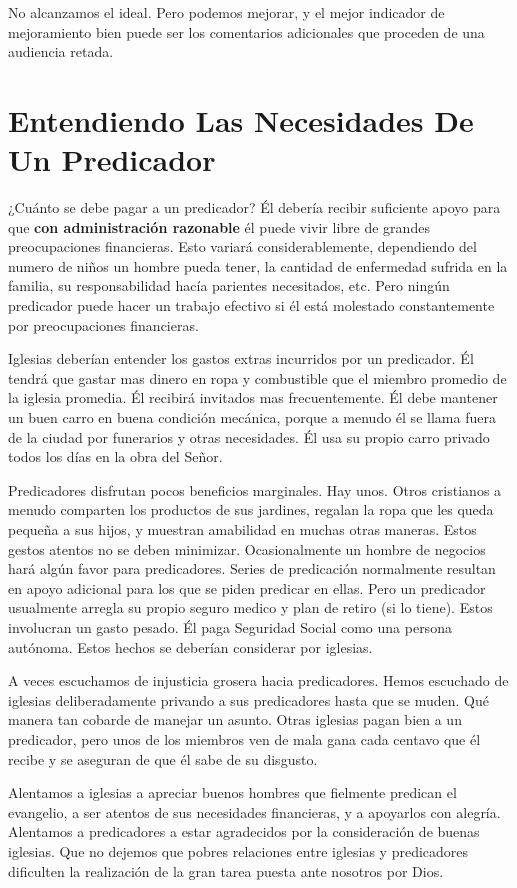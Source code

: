 \documentclass[12pt, twoside, openright]{book}
\begin{document}
No alcanzamos el ideal. Pero podemos mejorar, y el mejor indicador de mejoramiento bien puede ser los comentarios adicionales que proceden de una audiencia retada.

\section{Entendiendo Las Necesidades De Un Predicador}
¿Cuánto se debe pagar a un predicador? Él debería recibir suficiente apoyo para que \textbf{con administración razonable} él puede vivir libre de grandes preocupaciones financieras. Esto variará considerablemente, dependiendo del numero de niños un hombre pueda tener, la cantidad de enfermedad sufrida en la familia, su responsabilidad hacía parientes necesitados, etc. Pero ningún predicador puede hacer un trabajo efectivo si él está molestado constantemente por preocupaciones financieras. 

Iglesias deberían entender los gastos extras incurridos por un predicador. Él tendrá que gastar mas dinero en ropa y combustible que el miembro promedio de la iglesia promedia. Él recibirá invitados mas frecuentemente. Él debe mantener un buen carro en buena condición mecánica, porque a menudo él se llama fuera de la ciudad por funerarios y otras necesidades. Él usa su propio carro privado todos los días en la obra del Señor.

Predicadores disfrutan pocos beneficios marginales. Hay unos. Otros cristianos a menudo comparten los productos de sus jardines, regalan la ropa que les queda pequeña a sus hijos, y muestran amabilidad en muchas otras maneras. Estos gestos atentos no se deben minimizar. Ocasionalmente un hombre de negocios hará algún favor para predicadores. Series de predicación normalmente resultan en apoyo adicional para los que se piden predicar en ellas. Pero un predicador usualmente arregla su propio seguro medico y plan de retiro (si lo tiene). Estos involucran un gasto pesado. Él paga Seguridad Social como una persona autónoma. Estos hechos se deberían considerar por iglesias.

A veces escuchamos de injusticia grosera hacia predicadores. Hemos escuchado de iglesias deliberadamente privando a sus predicadores hasta que se muden. Qué manera tan cobarde de manejar un asunto. Otras iglesias pagan bien a un predicador, pero unos de los miembros ven de mala gana cada centavo que él recibe y se aseguran de que él sabe de su disgusto.

Alentamos a iglesias a apreciar buenos hombres que fielmente predican el evangelio, a ser atentos de sus necesidades financieras, y a apoyarlos con alegría. Alentamos a predicadores a estar agradecidos por la consideración de buenas iglesias. Que no dejemos que pobres relaciones entre iglesias y predicadores dificulten la realización de la gran tarea puesta ante nosotros por Dios.
\end{document}
